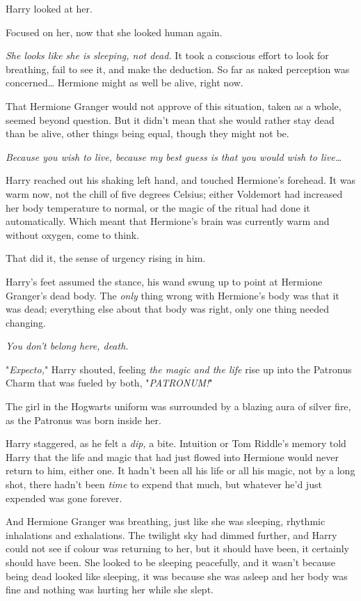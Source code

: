 Harry looked at her.

Focused on her, now that she looked human again.

\emph{She looks like she is sleeping, not dead.} It took a conscious effort to
look for breathing, fail to see it, and make the deduction. So far as naked
perception was concerned{\ldots} Hermione might as well be alive, right now.

That Hermione Granger would not approve of this situation, taken as a whole,
seemed beyond question. But it didn't mean that she would rather stay dead than
be alive, other things being equal, though they might not be.

\emph{Because you wish to live, because my best guess is that you would wish to
live{\ldots}}

Harry reached out his shaking left hand, and touched Hermione's forehead. It
was warm now, not the chill of five degrees Celsius; either Voldemort had
increased her body temperature to normal, or the magic of the ritual had done
it automatically. Which meant that Hermione's brain was currently warm and
without oxygen, come to think.

That did it, the sense of urgency rising in him.

Harry's feet assumed the stance, his wand swung up to point at Hermione
Granger's dead body. The \emph{only} thing wrong with Hermione's body was that
it was dead; everything else about that body was right, only one thing needed
changing.

\emph{You don't belong here, death.}

"\emph{Expecto,}" Harry shouted, feeling \emph{the magic and the life} rise up
into the Patronus Charm that was fueled by both, "\emph{PATRONUM!}"

The girl in the Hogwarts uniform was surrounded by a blazing aura of silver
fire, as the Patronus was born inside her.

Harry staggered, as he felt a \emph{dip,} a bite. Intuition or Tom Riddle's
memory told Harry that the life and magic that had just flowed into Hermione
would never return to him, either one. It hadn't been all his life or all his
magic, not by a long shot, there hadn't been \emph{time} to expend that much,
but whatever he'd just expended was gone forever.

And Hermione Granger was breathing, just like she was sleeping, rhythmic
inhalations and exhalations. The twilight sky had dimmed further, and Harry
could not see if colour was returning to her, but it should have been, it
certainly should have been. She looked to be sleeping peacefully, and it wasn't
because being dead looked like sleeping, it was because she was asleep and her
body was fine and nothing was hurting her while she slept.


